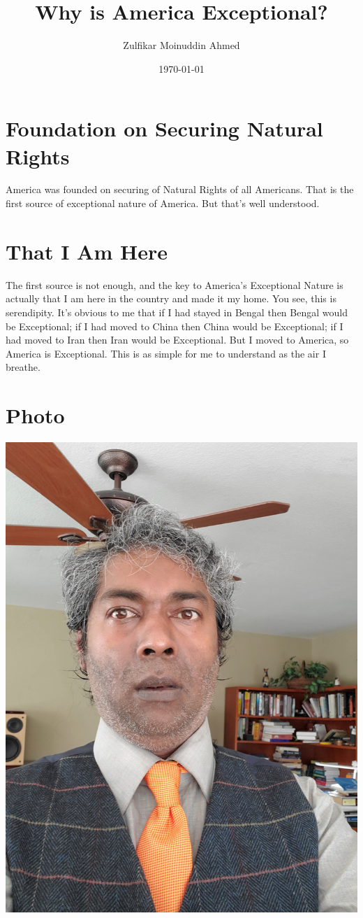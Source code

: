 \documentclass{amsart}
\title{Why is America Exceptional?}
\author{Zulfikar Moinuddin Ahmed}
\date{\today}
\begin{document}
\maketitle

\section{Foundation on Securing Natural Rights}

America was founded on securing of Natural Rights of all Americans.  That is the first source of exceptional nature of America.  But that's well understood.

\section{That I Am Here}

The first source is not enough, and the key to America's Exceptional Nature is actually that I am here in the country and made it my home.  You see, this is serendipity.  It's obvious to me that if I had stayed in Bengal then Bengal would be Exceptional; if I had moved to China then China would be Exceptional; if I had moved to Iran then Iran would be Exceptional.  But I moved to America, so America is Exceptional.  This is as simple for me to understand as the air I breathe.

\section{Photo}
\includegraphics[angle=270,scale=0.1]{photo.jpg}
\end{document}
